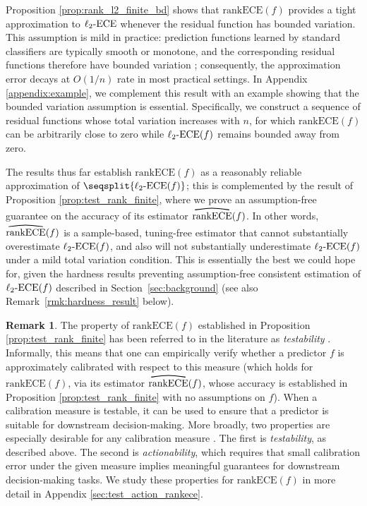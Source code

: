 \documentclass[11pt]{article}
\numberwithin{equation}{section}
\theoremstyle{definition}
\newtheorem{remark}{Remark}[section]
\newcommand{\myoverline}[2][3.5em]{%
  \overset{%
    \tikz[baseline=-0.1ex]{
      \draw[line width=0.75pt]
        (0,0) .. controls (#1/2,0.5ex) .. (#1,0);
    }%
  }{#2}%
}
\newcommand{\ECE}{\mathrm{ECE}}
\newcommand{\lECE}{\ell_2\textnormal{-}\ECE}
\newcommand{\rankECE}{\mathrm{rankECE}}
\newcommand{\hatrankECE}{\myoverline{\rankECE}}
\begin{document}
Proposition \ref{prop:rank_l2_finite_bd} shows that $\rankECE(f)$ provides a tight approximation to $\lECE$ whenever the residual function has bounded variation. This assumption is mild in practice: prediction functions learned by standard classifiers are typically smooth or monotone, and the corresponding residual functions therefore have bounded variation \citep{ciosek2026measuring}; consequently, the approximation error decays at $O(1/n)$ rate in most practical settings. In Appendix \ref{appendix:example}, we complement this result with an example showing that the bounded variation assumption is essential. Specifically, we construct a sequence of residual functions whose total variation increases with $n$, for which $\rankECE(f)$ can be arbitrarily close to zero while $\lECE(f)$ remains bounded away from zero.

The results thus far establish $\rankECE(f)$ as a reasonably reliable approximation of $\seqsplit{\lECE(f)}$; this is complemented by the result of Proposition \ref{prop:test_rank_finite}, where we prove an assumption-free guarantee on the accuracy of its estimator $\hatrankECE(f)$. In other words, $\hatrankECE(f)$ is a sample-based, tuning-free estimator that cannot substantially overestimate $\lECE(f)$, and also will not substantially underestimate $\lECE(f)$ under a mild total variation condition. This is essentially the best we could hope for, given the hardness results preventing assumption-free consistent estimation of $\lECE(f)$ described in Section~\ref{sec:background} (see also Remark~\ref{rmk:hardness_result} below).
\begin{remark}
    The property of $\rankECE(f)$ established in Proposition \ref{prop:test_rank_finite} has been referred to in the literature as \textit{testability} \citep{rossellini2025can,okoroafor2025nearoptimal}. Informally, this means that one can empirically verify whether a predictor $f$ is approximately calibrated with respect to this measure (which holds for $\rankECE(f)$, via its estimator $\hatrankECE(f)$, whose accuracy is established in Proposition \ref{prop:test_rank_finite} with no assumptions on $f$). When a calibration measure is testable, it can be used to ensure that a predictor is suitable for downstream decision-making. More broadly, two properties are especially desirable for any calibration measure \citep{rossellini2025can}. The first is \textit{testability}, as described above. The second is \textit{actionability}, which requires that small calibration error under the given measure implies meaningful guarantees for downstream decision-making tasks. We study these properties for $\rankECE(f)$ in more detail in Appendix \ref{sec:test_action_rankece}.
\end{remark}
\end{document}
